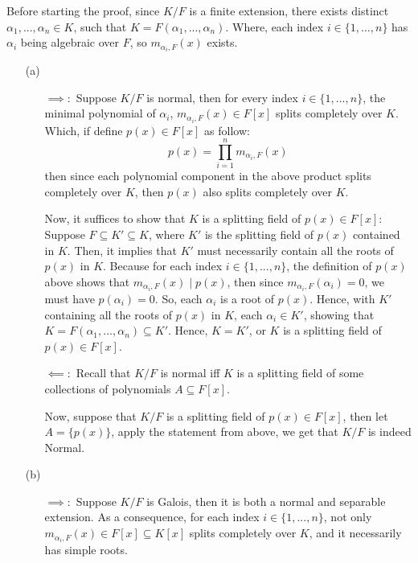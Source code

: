 \documentclass{article}
\begin{document}
Before starting the proof, since $K/F$ is a finite extension, there exists distinct $\alpha_1,...,\alpha_n\in K$, such that $K=F(\alpha_1,...,\alpha_n)$. Where, each index $i\in\{1,...,n\}$ has $\alpha_i$ being algebraic over $F$, so $m_{\alpha_i,F}(x)$ exists.
\begin{itemize}
    \item[(a)]
    \begin{itemize}
        \item[$\implies:$] Suppose $K/F$ is normal, then for every index $i\in\{1,...,n\}$, the minimal polynomial of $\alpha_i$, $m_{\alpha_i,F}(x)\in F[x]$ splits completely over $K$. Which, if define $p(x)\in F[x]$ as follow:
        $$p(x)=\prod_{i=1}^{n}m_{\alpha_i,F}(x)$$
        then since each polynomial component in the above product splits completely over $K$, then $p(x)$ also splits completely over $K$.

        Now, it suffices to show that $K$ is a splitting field of $p(x)\in F[x]$: Suppose $F\subseteq K'\subseteq K$, where $K'$ is the splitting field of $p(x)$ contained in $K$. Then, it implies that $K'$ must necessarily contain all the roots of $p(x)$ in $K$. Because for each index $i\in\{1,...,n\}$, the definition of $p(x)$ above shows that $m_{\alpha_i,F}(x)\mid p(x)$, then since $m_{\alpha_i,F}(\alpha_i)=0$, we must have $p(\alpha_i)=0$. So, each $\alpha_i$ is a root of $p(x)$. Hence, with $K'$ containing all the roots of $p(x)$ in $K$, each $\alpha_i\in K'$, showing that $K= F(\alpha_1,...,\alpha_n)\subseteq K'$. Hence, $K=K'$, or $K$ is a splitting field of $p(x)\in F[x]$.

        \item[$\impliedby:$] Recall that $K/F$ is normal iff $K$ is a splitting field of some collections of polynomials $A\subseteq F[x]$.
        
        Now, suppose that $K/F$ is a splitting field of $p(x)\in F[x]$, then let $A=\{p(x)\}$, apply the statement from above, we get that $K/F$ is indeed Normal.
    \end{itemize}

    \hfil

    \item[(b)] 
    \begin{itemize}
        \item[$\implies:$] Suppose $K/F$ is Galois, then it is both a normal and separable extension. As a consequence, for each index $i\in\{1,...,n\}$, not only $m_{\alpha_i,F}(x)\in F[x]\subseteq K[x]$ splits completely over $K$, and it necessarily has simple roots. 
        

\end{itemize}
\end{itemize}
\end{document}
